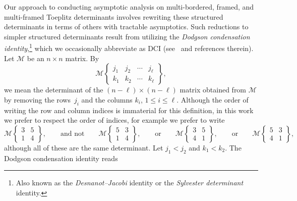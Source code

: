 \documentclass[10pt,a4paper]{amsart}
\numberwithin{equation}{section}
\begin{document}
Our approach to conducting asymptotic analysis on multi-bordered, framed, and multi-framed Toeplitz determinants involves rewriting these structured determinants in terms of others with tractable asymptotics. Such reductions to simpler structured determinants result from utilizing the \textit{Dodgson condensation identity},\footnote{Also known as the \textit{Desnanot--Jacobi} identity or the \textit{Sylvester determinant} identity.} which we occasionally abbreviate as DCI (see~\cite{Abeles,Bressoud,Fulmek-Kleber, GW} and references therein). Let $\boldsymbol{\mathscr{M}}$ be an $n \times n$ matrix. By
\[
 \mathscr{M} \left\lbrace \begin{matrix} j_1& j_2& \cdots & j_{\ell} \\ k_1& k_2& \cdots & k_{\ell} \end{matrix} \right\rbrace,
 \]
we mean the determinant of the $(n-\ell)\times(n-\ell)$ matrix obtained from $\boldsymbol{\mathscr{M}}$ by removing the rows~$j_i$ and the columns $k_i$, $1\leq i \leq \ell$. Although the order of writing the row and column indices is immaterial for this definition, in this work we prefer to respect the order of indices, for example we prefer to write \[ \mathscr{M} \left\lbrace \begin{matrix} 3& 5 \\ 1& 4 \end{matrix} \right\rbrace, \qquad \text{and not} \qquad \mathscr{M} \left\lbrace \begin{matrix} 5 & 3 \\ 1& 4 \end{matrix} \right\rbrace, \qquad \mbox{or} \qquad \mathscr{M} \left\lbrace \begin{matrix} 3& 5 \\ 4& 1 \end{matrix} \right\rbrace, \qquad \mbox{or} \qquad \mathscr{M} \left\lbrace \begin{matrix} 5 & 3 \\ 4& 1 \end{matrix} \right\rbrace, \]
although all of these are the same determinant. Let $j_1 < j_2$ and $k_1 < k_2$. The Dodgson condensation identity reads
\end{document}
